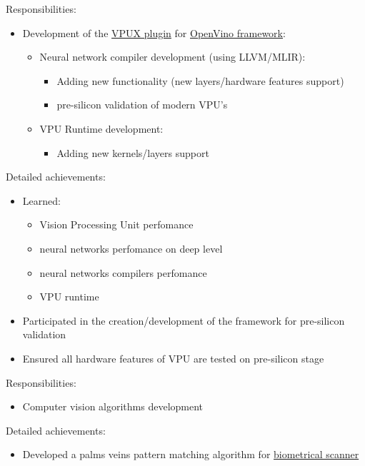 \documentclass[a4paper,11pt]{memoir}
\begin{document}
{
Responsibilities:
\begin{itemize}
	\item Development of the \href{https://github.com/openvinotoolkit/vpux-plugin}{VPUX plugin} for \href{https://github.com/openvinotoolkit/openvino}{OpenVino framework}:
	\begin{itemize}
		\item Neural network compiler development (using LLVM/MLIR):
		\begin{itemize}
			\item Adding new functionality (new layers/hardware features support)
			\item pre-silicon validation of modern VPU's
		\end{itemize}
		\item VPU Runtime development:
		\begin{itemize}
			\item Adding new kernels/layers support
		\end{itemize}
	\end{itemize}	
\end{itemize}
Detailed achievements:
\begin{itemize}
	\item Learned:
	\begin{itemize} 
		\item Vision Processing Unit perfomance
		\item neural networks perfomance on deep level
		\item neural networks compilers perfomance
		\item VPU runtime
	\end{itemize}
	\item Participated in the creation/development of the framework for pre-silicon validation
	\item Ensured all hardware features of VPU are tested on pre-silicon stage
\end{itemize}
}

{
Responsibilities:
\begin{itemize}
	\item Computer vision algorithms development
\end{itemize}
Detailed achievements:
\begin{itemize}
	\item Developed a palms veins pattern matching algorithm for \href{https://en.kalashnikovgroup.ru/media/perspektivnye-razrabotki/kontsern-kalashnikov-predstavil-sobstvennyy-biometricheskiy-skaner}{biometrical \mbox{scanner}}
\end{itemize}
}
\end{document}

